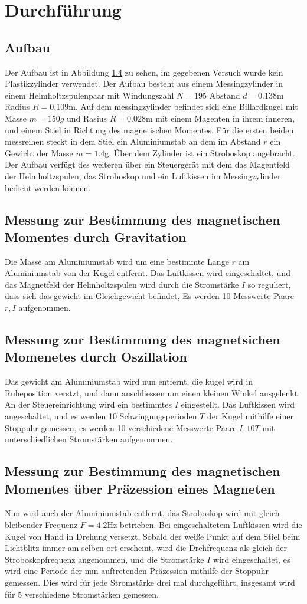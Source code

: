 \section{Durchführung}
\label{sec:Durchführung}
\subsection{Aufbau}
Der Aufbau ist in Abbildung \ref{} zu sehen, im gegebenen Versuch wurde kein Plastikzylinder verwendet.
Der Aufbau besteht aus einem Messingzylinder in einem Helmholtzspulenpaar mit Windungszahl $N = 195$ Abstand $d = 0.138$m Radius $R = 0.109$m. Auf dem messingzylinder befindet sich eine Billardkugel mit Masse $m = 150g$ und Rasius $R = 0.028$m mit einem Magenten in ihrem inneren, und einem Stiel in Richtung des magnetischen Momentes.
Für die ersten beiden messreihen steckt in dem Stiel ein Aluminiumstab an dem im Abstand $r$ ein Gewicht der Masse $m = 1.4$g. Über dem Zylinder ist ein Stroboskop angebracht. Der Aufbau verfügt des weiteren über ein Steuergerät mit dem das Magentfeld der Helmholtzspulen, 
das Stroboskop und ein Luftkissen im Messingzylinder bedient werden können.
\subsection{Messung zur Bestimmung des magnetischen Momentes durch Gravitation}
Die Masse am Aluminiumstab wird um eine bestimmte Länge $r$ am Aluminiumstab von der Kugel entfernt. Das Luftkissen wird eingeschaltet, und das Magnetfeld der Helmholtzspulen wird durch die Stromstärke $I$ so reguliert,
dass sich das gewicht im Gleichgewicht befindet, Es werden 10 Messwerte Paare $r,I$ aufgenommen.
\subsection{Messung zur Bestimmung des magnetsichen Momenetes durch Oszillation}
Das gewicht am Aluminiumstab wird nun entfernt, die kugel wird in Ruheposition verstzt, und dann anschliessen um einen kleinen Winkel ausgelenkt. An der Steuereinrichtung wird ein bestimmtes $I$ eingestellt. Das Luftkissen wird angeschaltet, und es werden 10 Schwingungsperioden $T$ der Kugel mithilfe einer Stoppuhr gemessen, es werden 10 verschiedene Messwerte Paare $I,10T$
mit unterschiedlichen Stromstärken aufgenommen.
\subsection{Messung zur Bestimmung des magnetischen Momentes über Präzession eines Magneten}
Nun wird auch der Aluminiumstab entfernt, das Stroboskop wird mit gleich bleibender Frequenz $F = 4.2$Hz betrieben. Bei eingeschaltetem Luftkissen wird die Kugel
 von Hand in Drehung versetzt. Sobald der weiße Punkt auf dem Stiel beim Lichtblitz immer am selben ort erscheint, wird die Drehfrequenz als gleich der Stroboskopfrequenz angenommen, und die Stromstärke $I$ wird eingeschaltet, es wird eine Periode der nun auftretenden Präzession mithilfe der Stoppuhr gemessen. 
 Dies wird für jede Stromstärke drei mal durchgeführt, insgesamt wird für 5 verschiedene Stromstärken gemessen.

